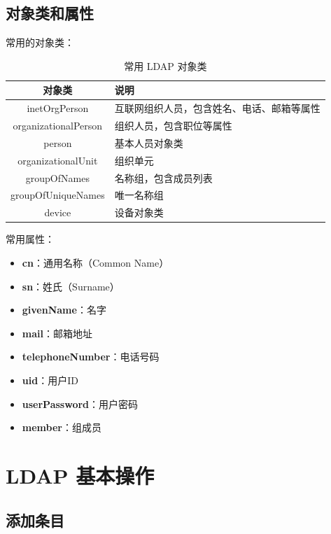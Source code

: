 \documentclass[12pt,UTF8]{ctexbook}
\begin{document}
\section{对象类和属性}
\label{sec:object_classes}

常用的对象类：

\begin{table}[htbp]
    \centering
    \caption{常用 LDAP 对象类}
    \begin{tabular}{|c|p{8cm}|}
        \hline
        \textbf{对象类} & \textbf{说明} \\
        \hline
        inetOrgPerson & 互联网组织人员，包含姓名、电话、邮箱等属性 \\
        \hline
        organizationalPerson & 组织人员，包含职位等属性 \\
        \hline
        person & 基本人员对象类 \\
        \hline
        organizationalUnit & 组织单元 \\
        \hline
        groupOfNames & 名称组，包含成员列表 \\
        \hline
        groupOfUniqueNames & 唯一名称组 \\
        \hline
        device & 设备对象类 \\
        \hline
    \end{tabular}
\end{table}

常用属性：
\begin{itemize}
    \item \textbf{cn}：通用名称（Common Name）
    \item \textbf{sn}：姓氏（Surname）
    \item \textbf{givenName}：名字
    \item \textbf{mail}：邮箱地址
    \item \textbf{telephoneNumber}：电话号码
    \item \textbf{uid}：用户ID
    \item \textbf{userPassword}：用户密码
    \item \textbf{member}：组成员
\end{itemize}

\chapter{LDAP 基本操作}
\label{chap:ldap_operations}

\section{添加条目}
\label{sec:add_entry}
\end{document}
